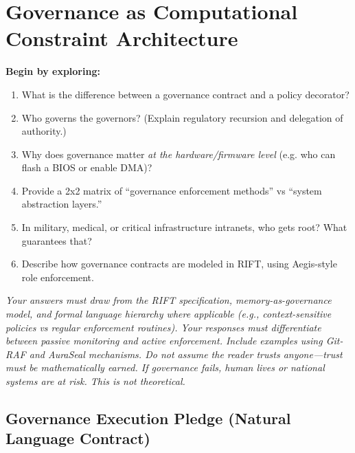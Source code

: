 \chapter{Governance as Computational Constraint Architecture}
\label{ch:governance_primer}
\begin{tcolorbox}
\textbf{Begin by exploring:}
\begin{enumerate}
\item What is the difference between a governance contract and a policy decorator?
\item Who governs the governors? (Explain regulatory recursion and delegation of authority.)
\item Why does governance matter \textit{at the hardware/firmware level} (e.g. who can flash a BIOS or enable DMA)?
\item Provide a 2x2 matrix of ``governance enforcement methods'' vs ``system abstraction layers.''
\item In military, medical, or critical infrastructure intranets, who gets root? What guarantees that?
\item Describe how governance contracts are modeled in RIFT, using Aegis-style role enforcement.
\end{enumerate}

\textit{Your answers must draw from the RIFT specification, memory-as-governance model, and formal language hierarchy where applicable (e.g., context-sensitive policies vs regular enforcement routines). Your responses must differentiate between passive monitoring and active enforcement. Include examples using Git-RAF and AuraSeal mechanisms. Do not assume the reader trusts anyone—trust must be mathematically earned. If governance fails, human lives or national systems are at risk. This is not theoretical.}
\end{tcolorbox}

\section*{Governance Execution Pledge (Natural Language Contract)}

